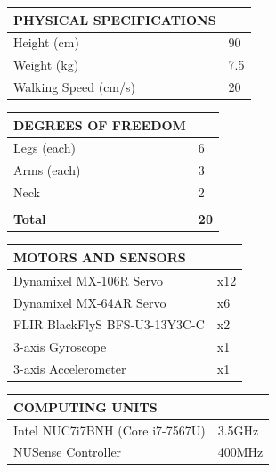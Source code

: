 \documentclass[10pt,a4paper]{article}
\begin{document}
\begin{multicols}{2}
\begin{table}[H]
	\begin{tabular}{|m{5.9cm}|m{1.25cm}|}
		\hline
		\rowcolor[rgb]{0.0, 0.0, 0.0}
		{\color{textcolour}\textbf{{PHYSICAL SPECIFICATIONS}}} & \\
		\hline
		Height (cm) & 90 \\
		\hline
		Weight (kg) & 7.5 \\
		\hline
		Walking Speed (cm/s) & 20 \\
		\hline
	\end{tabular}
\end{table}

\begin{table}[H]
	\begin{tabular}{|m{5.9cm}|m{1.25cm}|}
		\hline
		\rowcolor[rgb]{0.0, 0.0, 0.0}
		{\color{textcolour}\textbf{{DEGREES OF FREEDOM}}} & \\
		\hline
		Legs (each) & 6 \\
		\hline
		Arms (each) & 3 \\
		\hline
		Neck & 2 \\
		\hline
		& \\
		\hline
		\textbf{Total} & \textbf{20} \\
		\hline
	\end{tabular}
\end{table}

\begin{table}[H]
	\begin{tabular}{|m{5.9cm}|m{1.25cm}|}
		\hline
		\rowcolor[rgb]{0.0, 0.0, 0.0}
		{\color{textcolour}\textbf{{MOTORS AND SENSORS}}} & \\
		\hline
		Dynamixel MX-106R Servo & x12 \\
		\hline
		Dynamixel MX-64AR Servo & x6 \\
		\hline
		FLIR BlackFlyS BFS-U3-13Y3C-C & x2 \\
		\hline
		3-axis Gyroscope & x1 \\
		\hline
		3-axis Accelerometer & x1 \\
		\hline
	\end{tabular}
\end{table}

\begin{table}[H]
	\begin{tabular}{|m{5.9cm}|m{1.25cm}|}
		\hline
		\rowcolor[rgb]{0.0, 0.0, 0.0}
		{\color{textcolour}\textbf{{COMPUTING UNITS}}} & \\
		\hline
		Intel NUC7i7BNH (Core i7-7567U) & 3.5GHz \\
		\hline
		NUSense Controller & 400MHz \\
		\hline
	\end{tabular}
\end{table}


\end{multicols}
\end{document}
